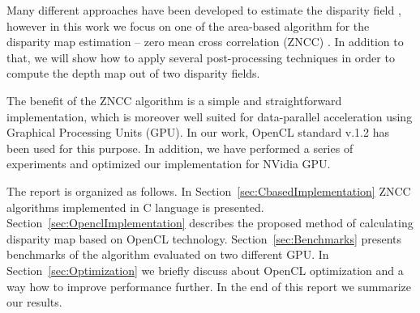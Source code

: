 \documentclass[conference]{IEEEtran}
\begin{document}
Many different approaches have been developed to estimate the disparity field \cite{}, however in this work we focus on one of the area-based algorithm for the disparity map estimation -- zero mean cross correlation (ZNCC) \cite{}. In addition to that, we will show how to apply several post-processing techniques in order to compute the depth map out of two disparity fields. 

The benefit of the ZNCC algorithm is a simple and straightforward implementation, which is moreover well suited for data-parallel acceleration using Graphical Processing Units (GPU). In our work, OpenCL standard v.1.2 has been used for this purpose. In addition, we have performed a series of experiments and optimized our implementation for NVidia GPU.

The report is organized as follows. In Section~\ref{sec:CbasedImplementation} ZNCC algorithms implemented in C language is presented. Section~\ref{sec:OpenclImplementation} describes the proposed method of calculating disparity map based on OpenCL technology. Section~\ref{sec:Benchmarks} presents benchmarks of the algorithm evaluated on two different GPU. In Section~\ref{sec:Optimization} we briefly discuss about OpenCL optimization and a way how to improve performance further. In the end of this report we summarize our results.
\end{document}

